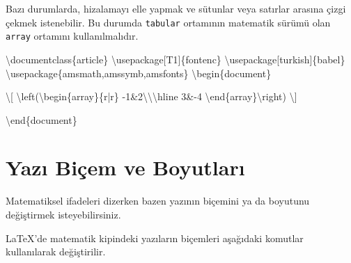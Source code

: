 \documentclass[
  letterpaper,
  DIV=11,
  numbers=noendperiod]{scrreprt}
\newenvironment{Shaded}{\begin{snugshade}}{\end{snugshade}}
\newcommand{\BuiltInTok}[1]{\textcolor[rgb]{0.00,0.23,0.31}{#1}}
\newcommand{\ExtensionTok}[1]{\textcolor[rgb]{0.00,0.23,0.31}{#1}}
\newcommand{\KeywordTok}[1]{\textcolor[rgb]{0.00,0.23,0.31}{#1}}
\newcommand{\NormalTok}[1]{\textcolor[rgb]{0.00,0.23,0.31}{#1}}
\newcommand{\SpecialCharTok}[1]{\textcolor[rgb]{0.37,0.37,0.37}{#1}}
\newcommand{\SpecialStringTok}[1]{\textcolor[rgb]{0.13,0.47,0.30}{#1}}
\begin{document}
Bazı durumlarda, hizalamayı elle yapmak ve sütunlar veya satırlar
arasına çizgi çekmek istenebilir. Bu durumda \texttt{tabular} ortamının
matematik sürümü olan \texttt{array} ortamını kullanılmalıdır.

\begin{Shaded}
\begin{Highlighting}[]
\BuiltInTok{\textbackslash{}documentclass}\NormalTok{\{}\ExtensionTok{article}\NormalTok{\}}
\BuiltInTok{\textbackslash{}usepackage}\NormalTok{[T1]\{}\ExtensionTok{fontenc}\NormalTok{\}}
\BuiltInTok{\textbackslash{}usepackage}\NormalTok{[turkish]\{}\ExtensionTok{babel}\NormalTok{\}}
\BuiltInTok{\textbackslash{}usepackage}\NormalTok{\{}\ExtensionTok{amsmath,amssymb,amsfonts}\NormalTok{\}}
\KeywordTok{\textbackslash{}begin}\NormalTok{\{}\ExtensionTok{document}\NormalTok{\}}

\SpecialStringTok{\textbackslash{}[}
\SpecialCharTok{\textbackslash{}left}\SpecialStringTok{(}\KeywordTok{\textbackslash{}begin}\NormalTok{\{}\ExtensionTok{array}\NormalTok{\}}\SpecialStringTok{\{r|r\}}
\SpecialStringTok{ {-}1\&2}\SpecialCharTok{\textbackslash{}\textbackslash{}\textbackslash{}hline}
\SpecialStringTok{  3\&{-}4}
\KeywordTok{\textbackslash{}end}\NormalTok{\{}\ExtensionTok{array}\NormalTok{\}}\SpecialCharTok{\textbackslash{}right}\SpecialStringTok{)}
\SpecialStringTok{\textbackslash{}]}

\KeywordTok{\textbackslash{}end}\NormalTok{\{}\ExtensionTok{document}\NormalTok{\}}
\end{Highlighting}
\end{Shaded}

\hypertarget{yazux131-biuxe7em-ve-boyutlarux131}{%
\section{Yazı Biçem ve
Boyutları}\label{yazux131-biuxe7em-ve-boyutlarux131}}

Matematiksel ifadeleri dizerken bazen yazının biçemini ya da boyutunu
değiştirmek isteyebilirsiniz.

{\LaTeX}'de matematik kipindeki yazıların biçemleri aşağıdaki komutlar
kullanılarak değiştirilir.
\end{document}
